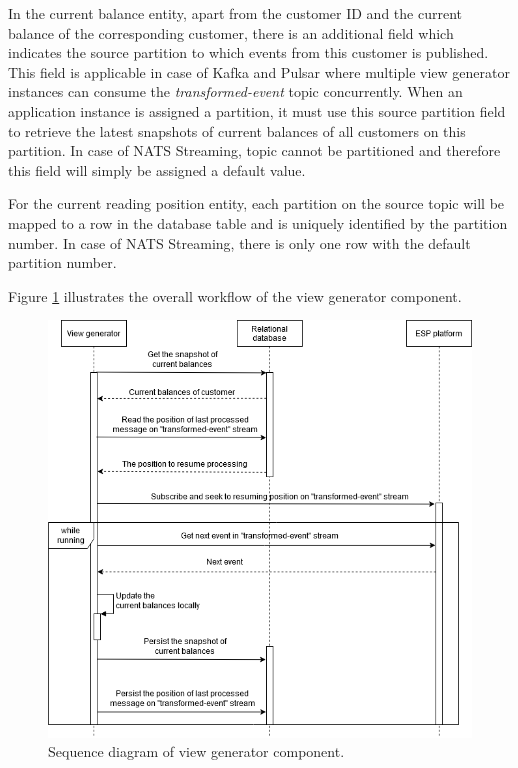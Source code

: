  

In the current balance entity, apart from the customer ID and the current balance of the corresponding customer, there is an additional field which indicates the source partition to which events from this customer is published. This field is applicable in case of Kafka and Pulsar where multiple view generator instances can consume the \emph{transformed-event} topic concurrently. When an application instance is assigned a partition, it must use this source partition field to retrieve the latest snapshots of current balances of all customers on this partition. In case of NATS Streaming, topic cannot be partitioned and therefore this field will simply be assigned a default value. 


 
For the current reading position entity, each partition on the source topic will be mapped to a row in the database table and is uniquely identified by the partition number. In case of NATS Streaming, there is only one row with the default partition number. 


Figure \ref{fig:implementviewgenerator} illustrates the overall workflow of the view generator component.
\newpage
\begin{figure}[h]
	\centering
	\includegraphics[width=\linewidth]{images/implement-view-generator.png}
	\caption{Sequence diagram of view generator component.}
	\label{fig:implementviewgenerator}
\end{figure}

